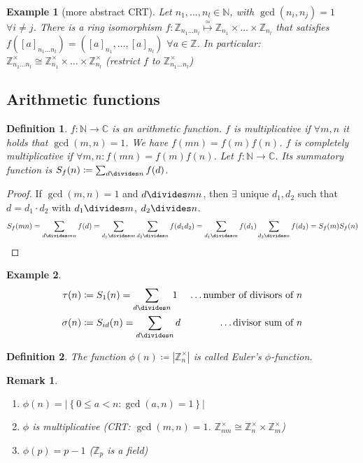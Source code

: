 \documentclass[a4paper]{article}
\newtheorem{defi}{Definition}
\newtheorem{rem}{Remark}
\newtheorem{ex}{Example}
\newcommand{\N}{\mathbb{N}}
\newcommand{\Z}{\mathbb{Z}}
\newcommand{\C}{\mathbb{C}}
\newcommand{\card}[1]{\left\vert{#1}\right\vert}
\newcommand{\set}[1]{\left\{#1\right\}}
\begin{document}
\begin{ex}[more abstract CRT]
  Let $n_1,\dots,n_l \in \N$, with $\gcd(n_i,n_j)= 1$ $\forall i \neq j$.
  There is a ring isomorphism $f: \Z_{n_1 \dots n_l} \overset{\simeq}{\mapsto} \Z_{n_1} \times \dots \times \Z_{n_l}$ that satisfies
  $f([a]_{n_1 \dots n_l}) = ([a]_{n_1},\dots,[a]_{n_l})$ $\forall a \in \Z$.
  In particular: $\Z_{n_1 \dots n_l}^\times \cong \Z_{n_1}^\times \times \dots \times \Z_{n_l}^\times$ (restrict $f$ to $\Z_{n_1 \dots n_l}^\times$)
\end{ex}


\subsection{Arithmetic functions}

\begin{defi}
  $f: \N \to \C$ is an \emph{arithmetic function}.
  $f$ is \emph{multiplicative} if $\forall m,n $ it holds that $\gcd(m,n) = 1$. We have $f(mn) = f(m) f(n)$.
  $f$ is \emph{completely multiplicative} if $\forall m,n: f(mn) = f(m) f(n)$.
  Let $f: \N \to \C$. Its \emph{summatory function} is $S_{f}(n) \coloneq \sum_{d\divides n} f(d)$.
\end{defi}

\begin{proof}
  If $\gcd(m,n) = 1$ and $d\divides mn$, then $\exists$ unique $d_1,d_2$ such that $d = d_1 \cdot d_2$ with $d_1 \divides  m$, $d_2\divides n$.
  \[S_f (mn) = \sum_{d\divides mn} f(d) = \sum_{d_1\divides m} \sum_{d_2\divides n} f(d_1 d_2) = \sum_{d_1\divides m} f(d_1) \sum_{d_2\divides n} f(d_2) = S_f(m) S_f(n)\]
\end{proof}

\begin{ex}
  \begin{align*}
    \tau(n) &\coloneq S_1(n) = \sum_{d\divides n} 1 &\text{\dots number of divisors of $n$} \\
    \sigma(n) &\coloneq S_{id}(n) = \sum_{d\divides n} d &\text{\dots divisor sum of $n$}
  \end{align*}
\end{ex}

\begin{defi}
  The function $\phi(n) \coloneq \card{\Z_n^\times}$ is called \emph{Euler's $\phi$-function}.
\end{defi}

\begin{rem}
  \begin{enumerate}
    \item $\phi(n) = \card{\set{ 0 \leq a < n : \gcd(a,n) = 1}}$
    \item $\phi$ is multiplicative (CRT: $\gcd(m,n) = 1$. $\Z_{nm}^\times \cong \Z_n^\times \times \Z_m^\times$)
    \item $\phi(p) = p - 1$ ($\Z_p$ is a field)
  \end{enumerate}
\end{rem}
\end{document}
